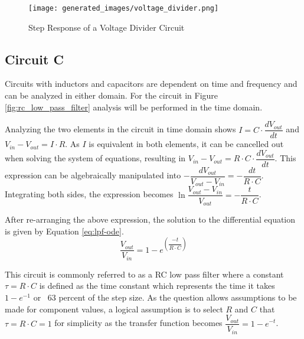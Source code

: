 \documentclass[main.tex]{subfiles}
\begin{document}
\begin{figure}[H]
    \centering
    \texttt{[image: generated\_images/voltage\_divider.png]}
    \caption{Step Response of a Voltage Divider Circuit}
    \label{fig:step-response-voltage-divider}
\end{figure}

\subsection{Circuit C}
Circuits with inductors and capacitors are dependent on time and frequency and can be analyzed in either domain. For the circuit in Figure \ref{fig:rc_low_pass_filter} analysis will be performed in the time domain. \newline

\newnoindentpara Analyzing the two elements in the circuit in time domain shows $I = C \cdot \dfrac{dV_{out}}{dt}$ and $V_{in} - V_{out} = I \cdot R$. As $I$ is equivalent in both elements, it can be cancelled out when solving the system of equations, resulting in $V_{in} - V_{out} = R \cdot C \cdot \dfrac{dV_{out}}{dt}$. This expression can be algebraically manipulated into $-\dfrac{dV_{out}}{V_{out}-V_{in}} = -\dfrac{dt}{R \cdot C}$. Integrating both sides, the expression becomes $\ln{\dfrac{V_{out}-V_{in}}{V_{out}}}=-\dfrac{t}{R \cdot C}$. \newline 

\newnoindentpara After re-arranging the above expression, the solution to the differential equation is given by Equation \ref{eq:lpf-ode}.
\begin{equation}
    \dfrac{V_{out}}{V_{in}} = 1-e^{\left( \dfrac{-t}{R \cdot C} \right)}
    \label{eq:lpf-ode}
\end{equation}

\noindent This circuit is commonly referred to as a RC low pass filter where a constant $\tau = R \cdot C$ is defined as the time constant which represents the time it takes $1-e^{-1}$ or ~63 percent of the step size. As the question allows assumptions to be made for component values, a logical assumption is to select $R$ and $C$ that $\tau = R \cdot C = 1$ for simplicity as the transfer function becomes $\dfrac{V_{out}}{V_{in}} = 1-e^{-t}$.
\end{document}
